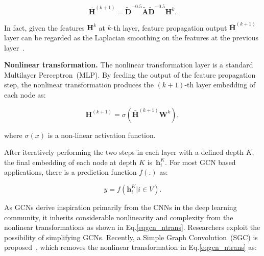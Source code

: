 \documentclass[letterpaper]{article} %
\newcommand{\Mat}[1]{\mathbf{#1}}
\begin{document}
 
\begin{small} 
\begin{equation}\label{eq:gcn_fpw_matrix}
\bar{\Mat{H}}^{(k+1)}=\Mat{\tilde{D}}^{-0.5}\Mat{\tilde{A}}\Mat{\tilde{D}}^{-0.5}\Mat{H}^k.
\end{equation} 
\end{small}

In fact, given the features $\Mat{H}^k$ at $k$-th layer, feature propagation output $\bar{\Mat{H}}^{(k+1)}$
layer can be regarded as the Laplacian smoothing on the features at the previous layer~\cite{li2018deeper,zhu2003semi}.
 

\textbf{Nonlinear transformation.} The nonlinear transformation layer is a standard Multilayer Perceptron~(MLP). By feeding the output of the feature propagation step, the nonlinear transformation produces the $(k+1)$-th layer embedding of each node as:

\begin{small}
\vspace{-0.3cm}
\begin{equation} \label{eqgcn_ntrans}
\mathbf{H}^{(k+1)}=\sigma(\bar{\Mat{H}}^{(k+1)}\mathbf{W}^k),
\end{equation}
\vspace{-0.4cm}
\end{small}

\noindent where $\sigma(x)$ is a non-linear activation function. 
 

After iteratively performing the two steps in each layer with a defined depth $K$, the final embedding of each node at depth $K$ is~{\footnotesize $\mathbf{h}^K_i$}. For most GCN based applications, there is a prediction function $f(.)$ as:

\begin{small}
\vspace{-0.3cm}
\begin{equation}
\hat{y}= f({\mathbf{h}^K_i|i\in V}).
\end{equation}
\vspace{-0.3cm}
\end{small}


As GCNs derive inspiration primarily from the CNNs in the deep learning community, it inherits considerable nonlinearity and complexity from the nonlinear transformations as shown in Eq.\eqref{eqgcn_ntrans}. Researchers exploit the possibility of simplifying
GCNs. Recently, a Simple Graph Convolution~(SGC) is proposed~\cite{ICML2019simplifying}, which removes the nonlinear transformation in Eq.\eqref{eqgcn_ntrans} as:
\end{document}
